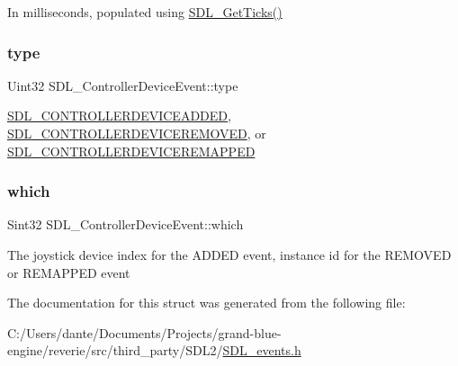 In milliseconds, populated using \mbox{\hyperlink{_s_d_l__timer_8h_a0b9bc71d6287e0ffafdc3419760fe2b3}{S\+D\+L\+\_\+\+Get\+Ticks()}} \mbox{\label{struct_s_d_l___controller_device_event_a45b3807eaf70a5f5cf712455da277536}} 
\subsubsection{\texorpdfstring{type}{type}}
{\footnotesize\ttfamily Uint32 S\+D\+L\+\_\+\+Controller\+Device\+Event\+::type}

\mbox{\hyperlink{_s_d_l__events_8h_a3b589e89be6b35c02e0dd34a55f3fccaa9642de478348da1aba4fb5791e8c5314}{S\+D\+L\+\_\+\+C\+O\+N\+T\+R\+O\+L\+L\+E\+R\+D\+E\+V\+I\+C\+E\+A\+D\+D\+ED}}, \mbox{\hyperlink{_s_d_l__events_8h_a3b589e89be6b35c02e0dd34a55f3fccaae00ac6995dfb7b92bfae68b9f47ae07a}{S\+D\+L\+\_\+\+C\+O\+N\+T\+R\+O\+L\+L\+E\+R\+D\+E\+V\+I\+C\+E\+R\+E\+M\+O\+V\+ED}}, or \mbox{\hyperlink{_s_d_l__events_8h_a3b589e89be6b35c02e0dd34a55f3fccaaeca87c7b5bb21915d444298449a78ee6}{S\+D\+L\+\_\+\+C\+O\+N\+T\+R\+O\+L\+L\+E\+R\+D\+E\+V\+I\+C\+E\+R\+E\+M\+A\+P\+P\+ED}} \mbox{\label{struct_s_d_l___controller_device_event_accb80de1619c1e790cffb6c888c915db}} 
\subsubsection{\texorpdfstring{which}{which}}
{\footnotesize\ttfamily Sint32 S\+D\+L\+\_\+\+Controller\+Device\+Event\+::which}

The joystick device index for the A\+D\+D\+ED event, instance id for the R\+E\+M\+O\+V\+ED or R\+E\+M\+A\+P\+P\+ED event 

The documentation for this struct was generated from the following file\+:\begin{DoxyCompactItemize}
\item 
C\+:/\+Users/dante/\+Documents/\+Projects/grand-\/blue-\/engine/reverie/src/third\+\_\+party/\+S\+D\+L2/\mbox{\hyperlink{_s_d_l__events_8h}{S\+D\+L\+\_\+events.\+h}}\end{DoxyCompactItemize}
